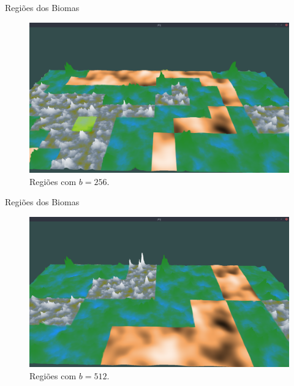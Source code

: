 \begin{frame}{Regiões dos Biomas}
    \begin{figure}[H]
        \centering
        \includegraphics[width=.9\textwidth]{img/re2bfb/b/256f4.png}
        \caption{Regiões com $b = 256$.}
        \label{fig:img_re2bfb_b_256f4}
    \end{figure}
    
    
\end{frame}

\begin{frame}{Regiões dos Biomas}
    \begin{figure}[H]
        \centering
        \includegraphics[width=.9\textwidth]{img/re2bfb/b/512f4.png}
        \caption{Regiões com $b = 512$.}
        \label{fig:img_re2bfb_b_512f4}
    \end{figure}
    
    
\end{frame}

